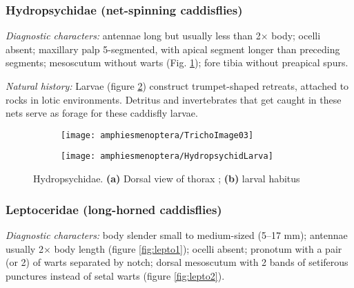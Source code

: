 \subsubsection{Hydropsychidae (net-spinning caddisflies)}
\noindent{}\textit{Diagnostic characters:} antennae long but usually less than 2$\times$ body; ocelli absent; maxillary palp 5-segmented, with apical segment longer than preceding segments; mesoscutum without warts (Fig. \ref{fig:hydropsychid1}); fore tibia without preapical spurs.\vspace{3mm}

\noindent{}\textit{Natural history:} Larvae (figure \ref{fig:hydropsychid2}) construct trumpet-shaped retreats, attached to rocks in lotic environments. Detritus and invertebrates that get caught in these nets serve as forage for these caddisfly larvae. 

\begin{figure}[ht!]
    \centering
    \begin{subfigure}[ht!]{0.3\textwidth}
        \texttt{[image: amphiesmenoptera/TrichoImage03]}
        \caption{}
        \label{fig:hydropsychid1}
    \end{subfigure}
    \hfill 
    \begin{subfigure}[ht!]{0.4\textwidth}
        \texttt{[image: amphiesmenoptera/HydropsychidLarva]}%
        \caption{}
        \label{fig:hydropsychid2}
    \end{subfigure}
    \caption{Hydropsychidae. \textbf{(a)} Dorsal view of thorax \citep[][Fig. 80]{bhl50956}; \textbf{(b)} larval habitus \citep[][Fig. 281]{bhl50956}}\label{fig:hydropsychids}
\end{figure}

\subsubsection{Leptoceridae (long-horned caddisflies)}%
\noindent{}\textit{Diagnostic characters:} body slender small to medium-sized (5--17 mm); antennae usually 2$\times$ body length (figure \ref{fig:lepto1}); ocelli absent; pronotum with a pair (or 2) of warts separated by notch; dorsal mesoscutum with 2 bands of setiferous punctures instead of setal warts (figure \ref{fig:lepto2}).\vspace{3mm}

